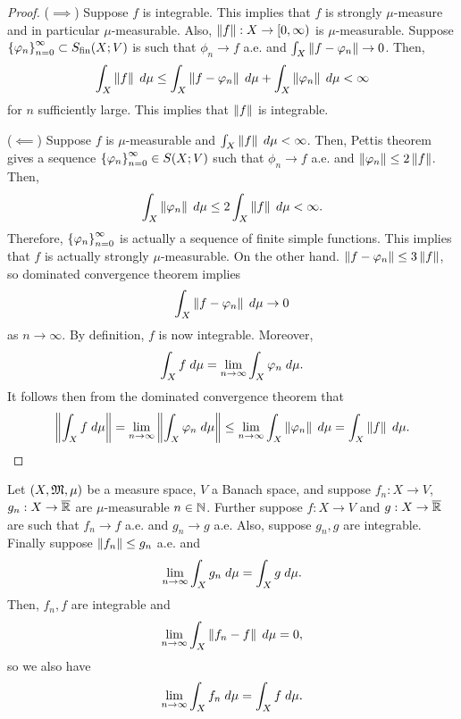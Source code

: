 \documentclass[a4paper]{article}
\begin{document}
\begin{proof}
($\implies$) Suppose $f$ is integrable. This implies that 
$f$ is strongly $\mu$-measure and in particular $\mu$-measurable.
Also, $\left\lVert f\right\rVert : X \to [0, \infty)$ is $\mu$-measurable. 
Suppose $\left\{ \varphi_n \right\}_{n=0}^\infty \subset S_{\text{fin}}(X; V)$ is such that 
$\phi_n \to f$ a.e. and $\int_X \left\lVert f - \varphi_n\right\rVert \to 0$.
Then, 
\[
\begin{aligned}
\int_X \left\lVert f\right\rVert \; d \mu 
\leq \int_X \left\lVert f - \varphi_n\right\rVert \; d \mu + \int_X \left\lVert \varphi_n\right\rVert
\; d \mu < \infty
\end{aligned}
\]
for $n$ sufficiently large. This implies that $\left\lVert f\right\rVert$
is integrable.

($\impliedby$) Suppose $f$ is $\mu$-measurable and 
$\int_X \left\lVert f\right\rVert \; d \mu < \infty$. Then, Pettis theorem 
gives a sequence $\left\{ \varphi_n \right\}_{n=0}^\infty \in S(X; V)$ such that 
$\phi_n \to f$ a.e. and $\left\lVert \varphi_n\right\rVert \leq 2\left\lVert f\right\rVert$.
Then, 
\[
\int_X \left\lVert \varphi_n\right\rVert \; d \mu \leq 2 \int_X \left\lVert f\right\rVert \; d \mu 
< \infty.
\]
Therefore, $\left\{ \varphi_n \right\}_{n=0}^\infty$ is actually a sequence of 
finite simple functions. This implies that 
$f$ is actually strongly $\mu$-measurable. On the other hand. 
$\left\lVert f - \varphi_n\right\rVert \leq 3\left\lVert f\right\rVert$, so 
dominated convergence theorem implies 
\[
\int_X \left\lVert f - \varphi_n\right\rVert \; d \mu \to 0
\]
as $n \to \infty$. By definition, $f$ is now integrable.
Moreover, 
\[
\int_X f \; d \mu = \lim_{n \to \infty} \int_X \varphi_n \; d \mu.
\]
It follows then from the dominated convergence theorem that 
\[
\begin{aligned}
\left\lVert \int_X f \; d \mu\right\rVert 
= \lim_{n \to \infty} \left\lVert \int_X \varphi_n \; d \mu\right\rVert  
\leq \lim_{n \to \infty} \int_X \left\lVert \varphi_n\right\rVert \; d \mu
= \int_X \left\lVert f\right\rVert \; d \mu.
\end{aligned}
\]
\end{proof}

\begin{thm}
Let $(X, \mathfrak{M}, \mu)$ be a measure space, $V$ a Banach space,
and suppose $f_n : X \to V$, $g_n : X \to \overline{\mathbb{R}}$ are 
$\mu$-measurable $n \in \mathbb{N}$. Further suppose 
$f: X \to V$ and $g: X \to \overline{\mathbb{R}}$ are such that 
$f_n \to f$ a.e. and $g_n \to g$ a.e. 
Also, suppose $g_n, g$ are integrable.
Finally suppose 
$\left\lVert f_n\right\rVert \leq g_n$ a.e. and 
\[
\lim_{n \to \infty} \int_X g_n \; d \mu = \int_X g \; d \mu.
\]
Then, $f_n, f$ are integrable and 
\[
\lim_{n \to \infty} \int_X \left\lVert f_n - f\right\rVert \; d \mu = 0,
\]
so we also have 
\[
\lim_{n \to \infty} \int_X f_n \; d \mu = \int_X f \; d \mu.
\]
\end{thm}
\end{document}
